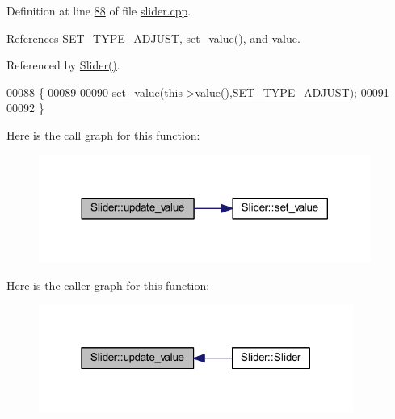 Definition at line \hyperlink{a00133_source_l00088}{88} of file \hyperlink{a00133_source}{slider.\+cpp}.



References \hyperlink{a00090_source_l00049}{S\+E\+T\+\_\+\+T\+Y\+P\+E\+\_\+\+A\+D\+J\+U\+S\+T}, \hyperlink{a00133_source_l00102}{set\+\_\+value()}, and \hyperlink{a00116_source_l00145}{value}.



Referenced by \hyperlink{a00133_source_l00014}{Slider()}.


\begin{DoxyCode}
00088                          \{
00089 
00090     \hyperlink{a00077_ae3010d3de02715db2f443560d7d2a27b}{set\_value}(this->\hyperlink{a00116_aee90379adb0307effb138f4871edbc5c}{value}(),\hyperlink{a00090_a16b6b7b5ad68ec0dd62a3c9e97f88adb}{SET\_TYPE\_ADJUST});
00091 
00092 \}
\end{DoxyCode}


Here is the call graph for this function\+:
\nopagebreak
\begin{figure}[H]
\begin{center}
\leavevmode
\includegraphics[width=308pt]{d1/d09/a00077_a4f62a01554ee8d975abe0cb136937695_cgraph}
\end{center}
\end{figure}




Here is the caller graph for this function\+:
\nopagebreak
\begin{figure}[H]
\begin{center}
\leavevmode
\includegraphics[width=292pt]{d1/d09/a00077_a4f62a01554ee8d975abe0cb136937695_icgraph}
\end{center}
\end{figure}





